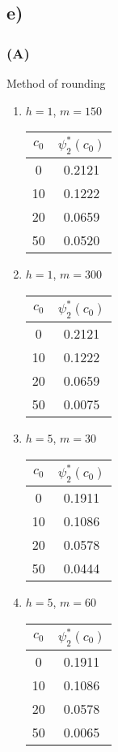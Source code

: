 \documentclass[titlepage]{article}
\begin{document}
	\subsection{e)}
	\subsubsection{(A)}
	Method of rounding
	\begin{enumerate}[]
		\item $h=1$, $m=150$\\
		\begin{tabular}{ |c|c|} 
			\hline
			$c_0$ & $\psi_2^*(c_0)$ \\ 
			\hline
			0 &  0.2121 \\ 
			10 & 0.1222 \\ 
			20 & 0.0659 \\ 
			50 & 0.0520 \\
			\hline
		\end{tabular}
	
		\item $h=1$, $m=300$\\
		\begin{tabular}{ |c|c|} 
			\hline
			$c_0$ & $\psi_2^*(c_0)$ \\ 
			\hline
			0 &  0.2121 \\ 
			10 & 0.1222 \\ 
			20 & 0.0659 \\ 
			50 & 0.0075 \\
			\hline
		\end{tabular}
	
		\item $h=5$, $m=30$\\
		\begin{tabular}{ |c|c|} 
			\hline
			$c_0$ & $\psi_2^*(c_0)$ \\ 
			\hline
			0 &  0.1911 \\ 
			10 & 0.1086 \\ 
			20 & 0.0578 \\ 
			50 & 0.0444 \\
			\hline
		\end{tabular}

		\item $h=5$, $m=60$\\
			\begin{tabular}{ |c|c|} 
				\hline
				$c_0$ & $\psi_2^*(c_0)$ \\ 
				\hline
				0 &  0.1911 \\ 
				10 & 0.1086 \\ 
				20 & 0.0578 \\ 
				50 & 0.0065 \\
				\hline
			\end{tabular}
	\end{enumerate}
\end{document}
